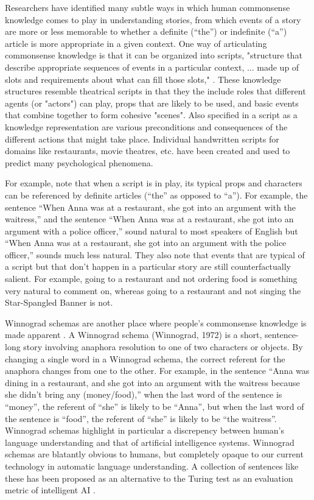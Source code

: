 \documentclass[10pt,a4paper]{article}
\begin{document}
Researchers have identified many subtle ways in which human commonsense knowledge comes to play in understanding stories, from which events of a story are more or less memorable to whether a definite (“the”) or indefinite (“a”) article is more appropriate in a given context. One way of articulating commonsense knowledge is that it can be organized into scripts, "structure that describe appropriate sequences of events in a particular context, ... made up of slots and requirements about what can fill those slots," \cite{schank1977scripts}.
These knowledge structures resemble theatrical scripts in that they the include roles that different agents (or "actors") can play, props that are likely to be used, and basic events that combine together to form cohesive "scenes".
Also specified in a script as a knowledge representation are various preconditions and consequences of the different actions that might take place.
Individual handwritten scripts for domains like restaurants, movie theatres, etc. have been created and used to predict many psychological phenomena.

For example,  note that when a script is in play, its typical props and characters can be referenced by definite articles (“the” as opposed to “a”). For example, the sentence “When Anna was at a restaurant, she got into an argument with the waitress,” and the sentence “When Anna was at a restaurant, she got into an argument with a police officer,” sound natural to most speakers of English but “When Anna was at a restaurant, she got into an argument with the police officer,” sounds much less natural. They also note that events that are typical of a script but that don’t happen in a particular story are still counterfactually salient. For example, going to a restaurant and not ordering food is something very natural to comment on, whereas going to a restaurant and not singing the Star-Spangled Banner is not.

Winnograd schemas are another place where people's commonsense knowledge is made apparent \cite{winograd1972understanding}.
A Winnograd schema (Winnograd, 1972) is a short, sentence-long story involving anaphora resolution to one of two characters or objects. By changing a single word in a Winnograd schema, the correct referent for the anaphora changes from one to the other. For example, in the sentence “Anna was dining in a restaurant, and she got into an argument with the waitress because she didn’t bring any (money/food),” when the last word of the sentence is “money”, the referent of “she” is likely to be “Anna”, but when the last word of the sentence is “food”, the referent of “she” is likely to be “the waitress”.
Winnograd schemas highlight in particular a discrepency between human's language understanding and that of artificial intelligence systems.
Winnograd schemas are blatantly obvious to humans, but completely opaque to our current technology in automatic language understanding.
A collection of sentences like these has been proposed as an alternative to the Turing test as an evaluation metric of intelligent AI \cite{levesque2011winograd}.
\end{document}
